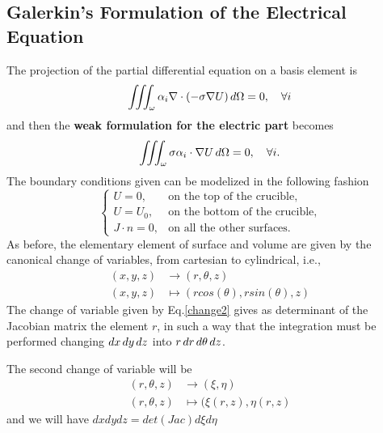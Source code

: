 


\subsection{Galerkin’s Formulation of the Electrical Equation}
The projection of the partial differential equation on a basis element is
\[\iiint_{\omega} \alpha_i \nabla\cdot(-\sigma\nabla U)\mathop{}\!d\Omega=0, \quad \forall i \]
and then the \textbf{weak formulation for the electric part} becomes
\begin{equation}
\iiint_{\omega}\sigma\alpha_i\cdot\nabla U\mathop{}\!d \Omega=0,\quad \forall i.
\end{equation}
The boundary conditions given can be modelized in the following fashion
\[\begin{cases}
	U = 0, &\text{on the top of the crucible,}\\
	U = U_0, &\text{on the bottom of the crucible,}\\
	J\cdot n=0, &\text{on all the other surfaces.}
\end{cases} \]
As before, the elementary element of surface and volume are given by the canonical change of variables, from cartesian to cylindrical, i.e., \begin{align}\label{change2}
(x,y,z)&\to(r,\theta,z)\\
(x,y,z)&\mapsto(rcos(\theta),rsin(\theta),z)\nonumber
\end{align}
The change of variable given by Eq.\ref{change2} gives as determinant of the Jacobian matrix the element $ r $, in such a way that the integration must be performed changing $ \mathop{}\!d x\mathop{}\!d y\mathop{}\!d z $ into $ r\mathop{}\!d r\mathop{}\!d\theta\mathop{}\!d z $.

The second change of variable will be 
\begin{align}\label{change3}
(r,\theta,z)&\to(\xi,\eta)\\
(r,\theta,z)&\mapsto(\xi(r,z),\eta(r,z)\nonumber
\end{align}
and we will have $ dxdydz=det(Jac)d\xi d\eta $
